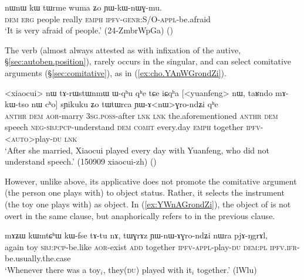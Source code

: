 \begin{exe}
\ex \label{ex:YWkWnWGmu}
\gll nɯnɯ kɯ tɯrme wuma ʑo ɲɯ-kɯ-nɯɣ-mu. \\
\textsc{dem} \textsc{erg} people really \textsc{emph} \textsc{ipfv}-\textsc{genr}:S/O-\textsc{appl}-be.afraid \\
\glt `It is very afraid of people.' (24-ZmbrWpGa)
()
\end{exe}

The verb  (almost always attested as  with infixation of the autive, §\ref{sec:autoben.position}), rarely occurs in the singular, and can select comitative arguments (§\ref{sec:comitative}), as in (\ref{ex:cho.YAnWGrondZi}).

\begin{exe}
\ex \label{ex:cho.YAnWGrondZi}
\gll <xiaocui> nɯ tɤ-rɯstɯnmɯ ɯ-qʰu qʰe tɕe iɕqʰa [<yuanfeng> nɯ, taʁndo mɤ-kɯ-tso nɯ cʰo] sɲikuku ʑo tɯtɯrca ɲɯ-ɤ<nɯ>ɣro-ndʑi qʰe \\
\textsc{anthr} \textsc{dem} \textsc{aor}-marry \textsc{3sg}.\textsc{poss}-after \textsc{lnk} \textsc{lnk} the.aforementioned  \textsc{anthr} \textsc{dem} speech \textsc{neg}-\textsc{sbj}:\textsc{pcp}-understand \textsc{dem} \textsc{comit} every.day \textsc{emph} together \textsc{ipfv}-<\textsc{auto}>play-\textsc{du} \textsc{lnk} \\
\glt `After she married, Xiaocui played every day with Yuanfeng, who did not understand speech.' (150909 xiaocui-zh)
()
\end{exe}

 However, unlike  above, its applicative  does not promote the comitative argument (the person one plays with) to object status. Rather, it selects the instrument (the toy one plays with) as object. In (\ref{ex:YWnAGrondZi}), the object of  is not overt in the same clause, but anaphorically refers to  in the previous clause.

\begin{exe}
\ex \label{ex:YWnAGrondZi}
\gll  mɤʑɯ kɯmtɕʰɯ kɯ-fse tɤ-tu nɤ, tɯɣrɤz ɲɯ-nɯ-ɤɣro-ndʑi nɯra pjɤ-ŋgrɤl,\\
again toy \textsc{sbj}:\textsc{pcp}-be.like \textsc{aor}-exist \textsc{add} together \textsc{ipfv}-\textsc{appl}-play-\textsc{du} \textsc{dem}:\textsc{pl} \textsc{ipfv}.\textsc{ifr}-be.usually.the.case \\
\glt `Whenever there was a toy$_i$, they(\textsc{du}) played with it$_i$ together.' (lWlu)
\end{exe}

